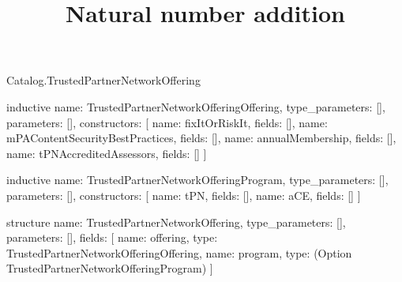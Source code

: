 \begin{lexlean}{Catalog.TrustedPartnerNetworkOffering}
\title{Natural number addition}
\begin{semanticmodule}
inductive{
  name: TrustedPartnerNetworkOfferingOffering,
  type_parameters: [],
  parameters: [],
  constructors: [
    {name: fixItOrRiskIt, fields: []},
    {name: mPAContentSecurityBestPractices, fields: []},
    {name: annualMembership, fields: []},
    {name: tPNAccreditedAssessors, fields: []}
  ]
}

inductive{
  name: TrustedPartnerNetworkOfferingProgram,
  type_parameters: [],
  parameters: [],
  constructors: [
    {name: tPN, fields: []},
    {name: aCE, fields: []}
  ]
}

structure{
  name: TrustedPartnerNetworkOffering,
  type_parameters: [],
  parameters: [],
  fields: [
    {name: offering, type: TrustedPartnerNetworkOfferingOffering},
    {name: program, type: (Option TrustedPartnerNetworkOfferingProgram)}
  ]
}
\end{semanticmodule}
\end{lexlean}
